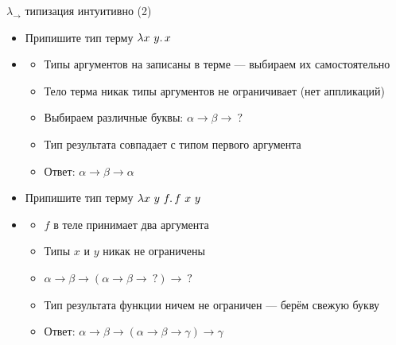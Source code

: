     \begin{frame}[fragile]{$\lambda_\to$ типизация интуитивно (2)}
        \begin{itemize}
            \item[\todo] Припишите тип терму $\lambda x~y\ldotp x$
            \item[\answer] \pause
            \begin{itemize}
                \item Типы аргументов на записаны в терме --- выбираем их самостоятельно
                \item Тело терма никак типы аргументов не ограничивает (нет аппликаций)
                \item Выбираем различные буквы: $\alpha \to \beta \to ~?$
                \item Тип результата совпадает с типом первого аргумента
                \item Ответ: $\alpha\to\beta\to\alpha$
            \end{itemize}
            \item[\todo] Припишите тип терму $\lambda x~y~f\ldotp f ~ x ~ y$
            \item[\answer] \pause
            \begin{itemize}
                \item $f$ в теле принимает два аргумента
                \item Типы $x$ и $y$ никак не ограничены
                \item $\alpha\to\beta\to(\alpha\to\beta\to~?)\to~?$
                \item Тип результата функции ничем не ограничен --- берём свежую букву
                \item Ответ: $\alpha\to\beta\to(\alpha\to\beta\to\gamma)\to\gamma$
            \end{itemize}
        \end{itemize}
    \end{frame}

